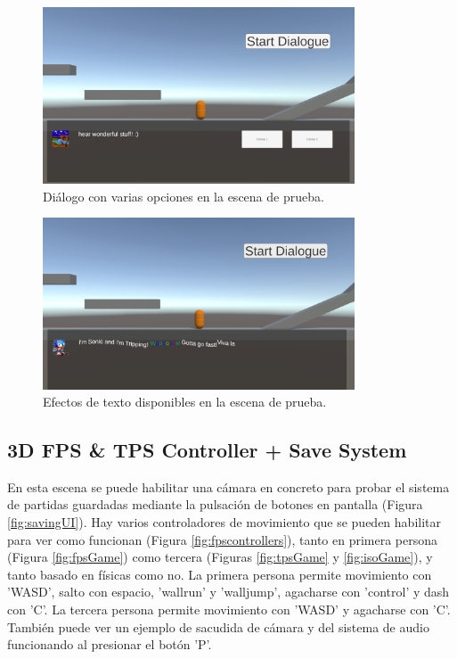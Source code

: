 \begin{figure}[H]
   \centering
     \includegraphics[width=350px,clip=true]{3DSideScrollerMultipleChoiceTestScene.png}
   \caption{Diálogo con varias opciones en la escena de prueba.}
   \label{fig:3dSideDialogue}
\end{figure}

\begin{figure}[H]
   \centering
     \includegraphics[width=350px,clip=true]{3DSideScrollerTextEffectTestScene.png}
   \caption{Efectos de texto disponibles en la escena de prueba.}
   \label{fig:3dSideEffects}
\end{figure}

\subsection{3D FPS \& TPS Controller + Save System}
En esta escena se puede habilitar una cámara en concreto para probar el sistema de partidas guardadas mediante la pulsación de botones en pantalla (Figura 
\ref{fig:savingUI}). Hay varios controladores de movimiento que se pueden habilitar para ver como funcionan (Figura \ref{fig:fpscontrollers}), tanto en
 primera persona (Figura \ref{fig:fpsGame}) como tercera (Figuras \ref{fig:tpsGame} y \ref{fig:isoGame}), y tanto basado en físicas como no. La primera 
 persona permite movimiento con 'WASD', salto con espacio, 'wallrun' y 'walljump', agacharse con 'control' y dash con 'C'. La tercera persona permite movimiento con 'WASD' y agacharse con 'C'. También puede ver un ejemplo de sacudida de
  cámara y del sistema de audio funcionando al presionar el botón 'P'. 


